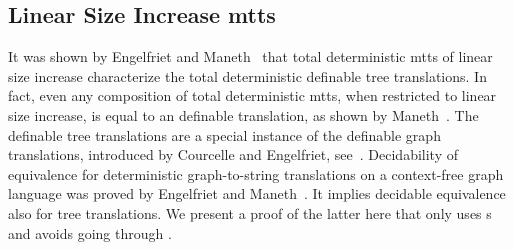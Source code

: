 \documentclass[copyright,creativecommons]{eptcs}
\begin{document}
\subsection{Linear Size Increase mtts}

It was shown by Engelfriet and Maneth~\cite{DBLP:journals/siamcomp/EngelfrietM03}
that total deterministic mtts of linear size increase 
characterize the total deterministic
 definable tree translations. In fact, even any composition of total deterministic
mtts, when restricted to linear size increase, is equal to an  definable translation,
as shown by Maneth~\cite{DBLP:conf/fsttcs/Maneth03}.
The  definable tree translations are a special instance of the
 definable graph translations, introduced by Courcelle and
Engelfriet, see~\cite{DBLP:books/daglib/0030804}.
Decidability of equivalence for deterministic  graph-to-string translations 
on a context-free graph language was proved by Engelfriet and Maneth~\cite{DBLP:journals/ipl/EngelfrietM06}.
It implies decidable equivalence also for  tree translations.
We present a proof of the latter here that only uses s and avoids going through . 
\end{document}

